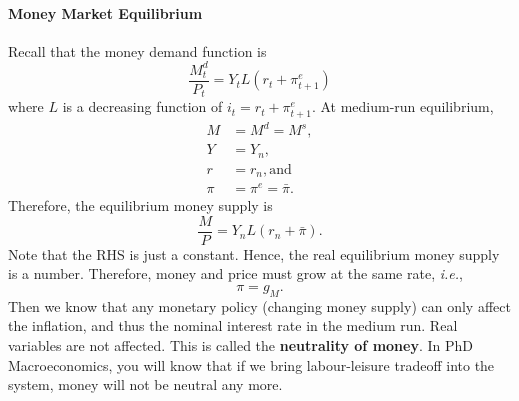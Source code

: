 \documentclass[12pt]{article}
\begin{document}
\paragraph{Money Market Equilibrium}
Recall that the money demand function is
\[\frac{M^d_t}{P_t} = Y_t L(r_t+\pi^e_{t+1})\]
where $L$ is a decreasing function of $i_t = r_t + \pi^e_{t+1}$.
At medium-run equilibrium,
\begin{align*}
    M &= M^d = M^s,\\
    Y &= Y_n,\\
    r &= r_n, \text{and }\\
    \pi&= \pi^e = \bar{\pi}.
\end{align*}
Therefore, the equilibrium money supply is
\[\frac{M}{P} = Y_n L(r_n + \bar{\pi}).\]
Note that the RHS is just a constant. Hence, the real equilibrium money supply is a number. Therefore, money and price must grow at the same rate, \textit{i.e.},
\[\pi = g_M.\]
Then we know that any monetary policy (changing money supply) can only affect the inflation, and thus the nominal interest rate in the medium run. Real variables are not affected. This is called the \textbf{neutrality of money}. In PhD Macroeconomics, you will know that if we bring labour-leisure tradeoff into the system, money will not be neutral any more.
\end{document}
